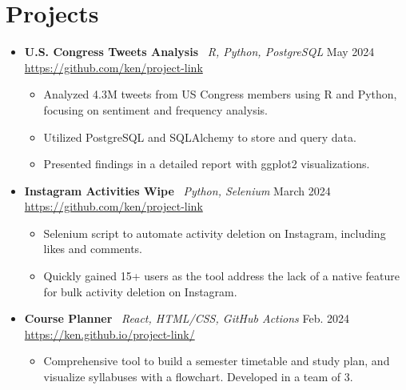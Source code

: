 \documentclass{article}
\begin{document}
\section{Projects}
\begin{itemize}

    \item \textbf{U.S. Congress Tweets Analysis} \, \textit{R, Python, PostgreSQL} \hfill May 2024 \\
          \href{https://github.com/...}{https://github.com/ken/project-link}
          \begin{itemize}
              \item Analyzed 4.3M tweets from US Congress members using R and Python, focusing on sentiment and frequency analysis.
              \item Utilized PostgreSQL and SQLAlchemy to store and query data.
              \item Presented findings in a detailed report with ggplot2 visualizations.
          \end{itemize}
    \item \textbf{Instagram Activities Wipe} \, \textit{Python, Selenium} \hfill March 2024 \\
          \href{https://github.com/...}{https://github.com/ken/project-link}
          \begin{itemize}
              \item Selenium script to automate activity deletion on Instagram, including likes and comments.
              \item Quickly gained 15+ users as the tool address the lack of a native feature for bulk activity deletion on Instagram.
          \end{itemize}
    \item \textbf{Course Planner} \, \textit{React, HTML/CSS, GitHub Actions} \hfill Feb. 2024 \\
          \href{https://ken.github.io/.../}{https://ken.github.io/project-link/}
          \begin{itemize}
              \item Comprehensive tool to build a semester timetable and study plan, and visualize syllabuses with a flowchart. Developed in a team of 3.

\end{itemize}
\end{itemize}
\end{document}
